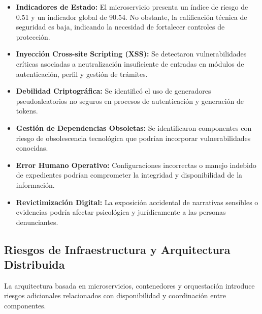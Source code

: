 \documentclass[12pt,oneside,letterpaper]{book}
\begin{document}
\begin{itemize}

\item \textbf{Indicadores de Estado:}
El microservicio presenta un índice de riesgo de 0.51 y un indicador global de 90.54. No obstante, la calificación técnica de seguridad es baja, indicando la necesidad de fortalecer controles de protección.

\item \textbf{Inyección Cross-site Scripting (XSS):}
Se detectaron vulnerabilidades críticas asociadas a neutralización insuficiente de entradas en módulos de autenticación, perfil y gestión de trámites.

\item \textbf{Debilidad Criptográfica:}
Se identificó el uso de generadores pseudoaleatorios no seguros en procesos de autenticación y generación de tokens.

\item \textbf{Gestión de Dependencias Obsoletas:}
Se identificaron componentes con riesgo de obsolescencia tecnológica que podrían incorporar vulnerabilidades conocidas.

\item \textbf{Error Humano Operativo:}
Configuraciones incorrectas o manejo indebido de expedientes podrían comprometer la integridad y disponibilidad de la información.

\item \textbf{Revictimización Digital:}
La exposición accidental de narrativas sensibles o evidencias podría afectar psicológica y jurídicamente a las personas denunciantes.

\end{itemize}


\subsection{Riesgos de Infraestructura y Arquitectura Distribuida}

La arquitectura basada en microservicios, contenedores y orquestación introduce riesgos adicionales relacionados con disponibilidad y coordinación entre componentes.
\end{document}
